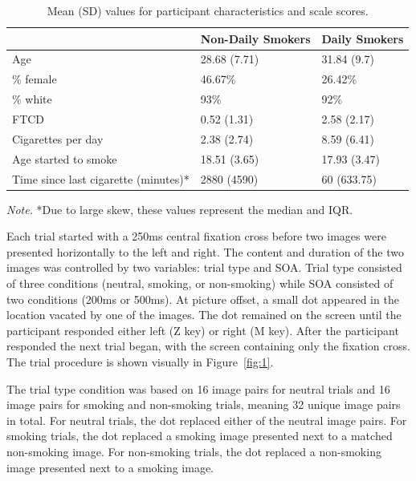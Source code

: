 \documentclass[empirical, authordate, issue]{jote-new-article}
\begin{document}
\begin{table}[h!]


  \begin{fullwidth}
    \caption{Mean (SD) values for participant characteristics and scale scores.}
    \label{tab:1}
    \begin{tabularx}{\linewidth}{@{}>{\RaggedRight\arraybackslash}X  l  l@{}}

      \toprule
                                           & {Non-Daily Smokers} & {Daily Smokers} \\ \midrule
      Age                                  & 28.68 (7.71)        & 31.84 (9.7)     \\
      \% female                            & 46.67{\%}           & 26.42{\%}       \\
      \% white                             & 93{\%}              & 92{\%}          \\
      FTCD                                 & 0.52 (1.31)         & 2.58 (2.17)     \\
      Cigarettes per day                   & 2.38 (2.74)         & 8.59 (6.41)     \\
      Age started to smoke                 & 18.51 (3.65)        & 17.93 (3.47)    \\
      Time since last cigarette (minutes)* & 2880 (4590)         & 60 (633.75)     \\ \bottomrule
    \end{tabularx}


    \small
    \emph{Note.} *Due to large skew, these values represent the median and IQR.
  \end{fullwidth}
\end{table}
Each trial started with a 250ms central fixation cross before two images were presented horizontally to the left and right. The content and duration of the two images was controlled by two variables: trial type and SOA. Trial type consisted of three conditions (neutral, smoking, or non-smoking) while SOA consisted of two conditions (200ms or 500ms). At picture offset, a small dot appeared in the location vacated by one of the images. The dot remained on the screen until the participant responded either left (Z key) or right (M key). After the participant responded the next trial began, with the screen containing only the fixation cross. The trial procedure is shown visually in Figure~\ref{fig:1}.

The trial type condition was based on 16 image pairs for neutral trials and 16 image pairs for smoking and non-smoking trials, meaning 32 unique image pairs in total. For neutral trials, the dot replaced either of the neutral image pairs. For smoking trials, the dot replaced a smoking image presented next to a matched non-smoking image. For non-smoking trials, the dot replaced a non-smoking image presented next to a smoking image.
\end{document}
